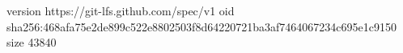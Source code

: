 version https://git-lfs.github.com/spec/v1
oid sha256:468afa75e2de899c522e8802503f8d64220721ba3af7464067234c695e1c9150
size 43840
